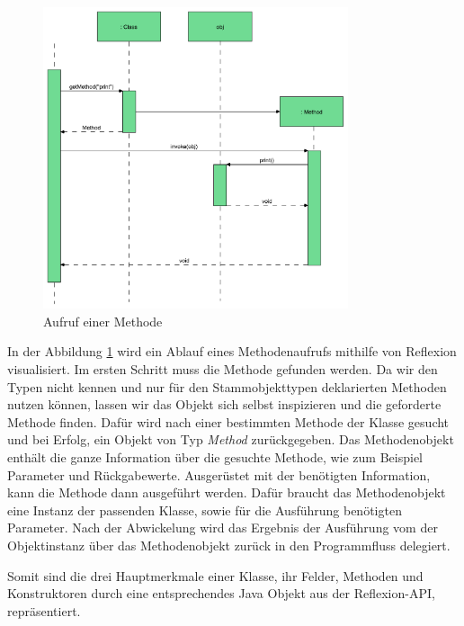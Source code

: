   \begin{figure}[h!]
    \centering
    \includegraphics[width=0.8\textwidth]{material/images/flussReflection.pdf}
    \caption{Aufruf einer Methode \cite{Forman04javareflection}}
    \label{fig:refl-fluss}
  \end{figure}

  In der Abbildung \ref{fig:refl-fluss} wird ein Ablauf eines Methodenaufrufs mithilfe von Reflexion visualisiert. Im ersten Schritt muss die Methode gefunden werden. Da wir den Typen nicht kennen und nur für den Stammobjekttypen deklarierten Methoden nutzen können, lassen wir das Objekt sich selbst inspizieren und die geforderte Methode finden. Dafür wird nach einer bestimmten Methode der Klasse gesucht und bei Erfolg, ein Objekt von Typ \textit{Method} zurückgegeben. Das Methodenobjekt enthält die ganze Information über die gesuchte Methode, wie zum Beispiel Parameter und Rückgabewerte. Ausgerüstet mit der benötigten Information, kann die Methode dann ausgeführt werden. Dafür braucht das Methodenobjekt eine Instanz der passenden Klasse, sowie für die Ausführung benötigten Parameter. Nach der Abwickelung wird das Ergebnis der Ausführung vom der Objektinstanz über das Methodenobjekt zurück in den Programmfluss delegiert. \cite{Forman04javareflection} 

  \bigbreak Somit sind die drei Hauptmerkmale einer Klasse, ihr Felder, Methoden und Konstruktoren durch eine entsprechendes Java Objekt aus der Reflexion-API, repräsentiert. 

